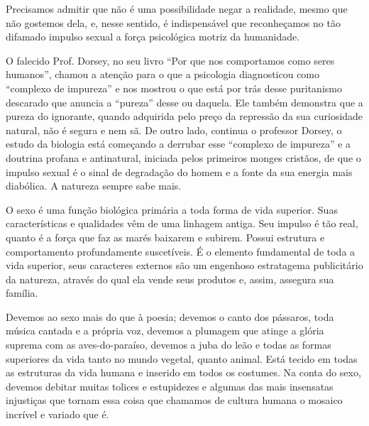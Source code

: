 Precisamos admitir que não é uma possibilidade negar a realidade, mesmo
que não gostemos dela, e, nesse sentido, é indispensável que
reconheçamos no tão difamado impulso sexual a força psicológica motriz
da humanidade.

\asterisc

O falecido Prof. Dorsey, no seu livro ``Por que nos comportamos como
seres humanos'', chamou a atenção para o que a psicologia diagnosticou
como ``complexo de impureza'' e nos mostrou o que está por trás desse
puritanismo descarado que anuncia a ``pureza'' desse ou daquela. Ele
também demonstra que a pureza do ignorante, quando adquirida pelo preço
da repressão da sua curiosidade natural, não é segura e nem sã. De outro
lado, continua o professor Dorsey, o estudo da biologia está começando a
derrubar esse ``complexo de impureza'' e a doutrina profana e
antinatural, iniciada pelos primeiros monges cristãos, de que o impulso
sexual é o sinal de degradação do homem e a fonte da sua energia mais
diabólica. A natureza sempre sabe mais.

O sexo é uma função biológica primária a toda forma de vida superior.
Suas características e qualidades vêm de uma linhagem antiga. Seu
impulso é tão real, quanto é a força que faz as marés baixarem e
subirem. Possui estrutura e comportamento profundamente suscetíveis. É o
elemento fundamental de toda a vida superior, seus caracteres externos
são um engenhoso estratagema publicitário da natureza, através do qual
ela vende seus produtos e, assim, assegura sua família.

Devemos ao sexo mais do que à poesia; devemos o canto dos pássaros, toda
música cantada e a própria voz, devemos a plumagem que atinge a glória
suprema com as aves-do-paraíso, devemos a juba do leão e todas as formas
superiores da vida tanto no mundo vegetal, quanto animal. Está tecido em
todas as estruturas da vida humana e inserido em todos os costumes. Na
conta do sexo, devemos debitar muitas tolices e estupidezes e algumas
das mais insensatas injustiças que tornam essa coisa que chamamos de
cultura humana o mosaico incrível e variado que é.

